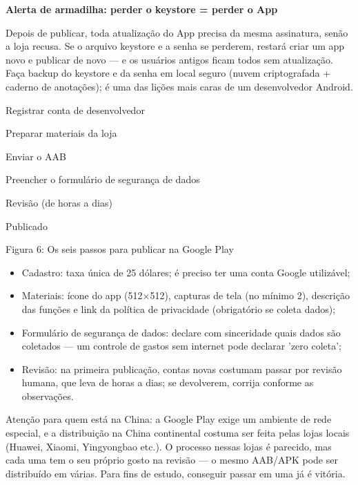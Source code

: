 \textbf{Alerta de armadilha: perder o keystore = perder o App}\par

Depois de publicar, toda atualização do App precisa da mesma assinatura, senão a loja recusa. Se o arquivo keystore e a senha se perderem, restará criar um app novo e publicar de novo — e os usuários antigos ficam todos sem atualização. Faça backup do keystore e da senha em local seguro (nuvem criptografada + caderno de anotações); é uma das lições mais caras de um desenvolvedor Android.


Registrar conta de desenvolvedor

Preparar materiais da loja

Enviar o AAB

Preencher o formulário de segurança de dados

Revisão (de horas a dias)

Publicado

\begin{center}\small\color{gray}Figura 6: Os seis passos para publicar na Google Play\end{center}

\begin{itemize}
  \item Cadastro: taxa única de 25 dólares; é preciso ter uma conta Google utilizável;
  \item Materiais: ícone do app (512×512), capturas de tela (no mínimo 2), descrição das funções e link da política de privacidade (obrigatório se coleta dados);
  \item Formulário de segurança de dados: declare com sinceridade quais dados são coletados — um controle de gastos sem internet pode declarar 'zero coleta';
  \item Revisão: na primeira publicação, contas novas costumam passar por revisão humana, que leva de horas a dias; se devolverem, corrija conforme as observações.
\end{itemize}

Atenção para quem está na China: a Google Play exige um ambiente de rede especial, e a distribuição na China continental costuma ser feita pelas lojas locais (Huawei, Xiaomi, Yingyongbao etc.). O processo nessas lojas é parecido, mas cada uma tem o seu próprio gosto na revisão — o mesmo AAB/APK pode ser distribuído em várias. Para fins de estudo, conseguir passar em uma já é vitória.

